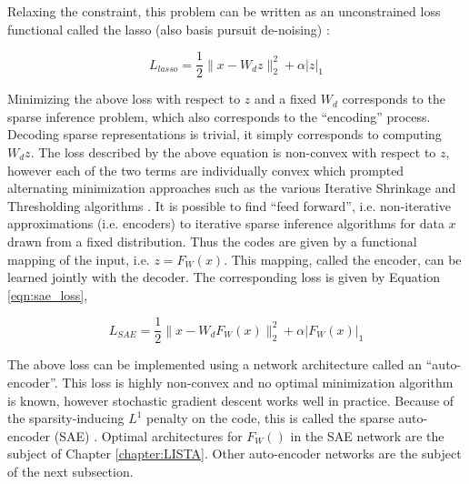 Relaxing the constraint, this problem can be written as an unconstrained loss
functional called the lasso (also basis pursuit de-noising) \cite{BP}:  

\begin{equation} 
L_{lasso} = \frac{1}{2}\|x-W_dz\|^2_2 + \alpha |z|_1
\label{eqn:lasso} 
\end{equation} 

Minimizing the above loss with respect to $z$ and a fixed $W_d$ corresponds to
the sparse inference problem, which also corresponds to the ``encoding''
process. Decoding sparse representations is trivial, it simply corresponds to
computing $W_dz$.  The loss described by the above equation is non-convex with
respect to $z$, however each of the two terms are individually convex which
prompted alternating minimization approaches such as the various Iterative
Shrinkage and Thresholding algorithms \cite{FISTA}. It is possible to find
``feed forward'', i.e. non-iterative approximations (i.e. encoders) to
iterative sparse inference algorithms for data $x$ drawn from a fixed
distribution. Thus the codes are given by a functional mapping of the input,
i.e. $z=F_W(x)$. This mapping, called the encoder, can be learned jointly with
the decoder.  The corresponding loss is given by Equation \ref{eqn:sae_loss}, 

\begin{equation} 
L_{SAE} = \frac{1}{2}\|x-W_dF_W(x)\|^2_2 + \alpha |F_W(x)|_1
\label{eqn:sae_loss} 
\end{equation} 

The above loss can be implemented using a network architecture called an
``auto-encoder''. This loss is highly non-convex and no optimal minimization
algorithm is known, however stochastic gradient descent works well in practice.
Because of the sparsity-inducing $L^1$ penalty on the code, this is called the
sparse auto-encoder (SAE) \cite{SAE1,SAE2}. Optimal architectures for $F_W()$
in the SAE network are the subject of Chapter \ref{chapter:LISTA}. Other
auto-encoder networks are the subject of the next subsection.    

